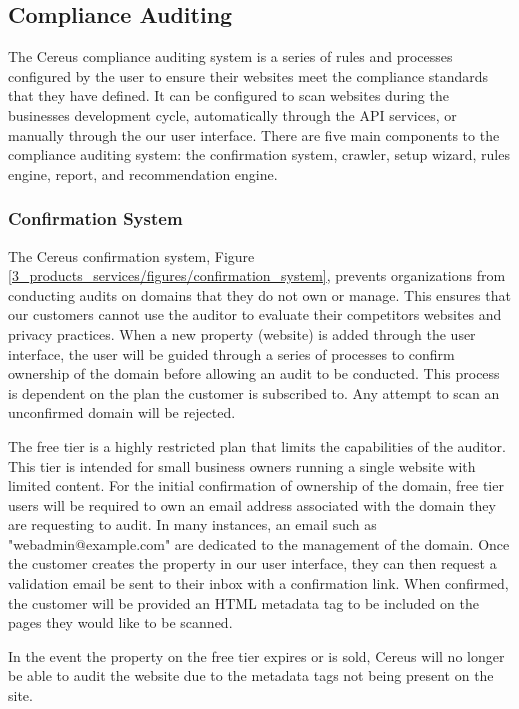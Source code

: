 \subsection{Compliance Auditing}

The Cereus compliance auditing system is a series of rules and processes configured by the user to ensure their websites meet the compliance standards that they have defined. It can be configured to scan websites during the businesses development cycle, automatically through the API services, or manually through the our user interface. There are five main components to the compliance auditing system: the confirmation system, crawler, setup wizard, rules engine, report, and recommendation engine.

\subsubsection{Confirmation System}

The Cereus confirmation system, Figure \ref{3_products_services/figures/confirmation_system}, prevents organizations from conducting audits on domains that they do not own or manage. This ensures that our customers cannot use the auditor to evaluate their competitors websites and privacy practices. When a new property (website) is added through the user interface, the user will be guided through a series of processes to confirm ownership of the domain before allowing an audit to be conducted. This process is dependent on the plan the customer is subscribed to. Any attempt to scan an unconfirmed domain will be rejected.

The free tier is a highly restricted plan that limits the capabilities of the auditor. This tier is intended for small business owners running a single website with limited content. For the initial confirmation of ownership of the domain, free tier users will be required to own an email address associated with the domain they are requesting to audit. In many instances, an email such as "webadmin@example.com" are dedicated to the management of the domain. Once the customer creates the property in our user interface, they can then request a validation email be sent to their inbox with a confirmation link. When confirmed, the customer will be provided an HTML metadata tag to be included on the pages they would like to be scanned.

In the event the property on the free tier expires or is sold, Cereus will no longer be able to audit the website due to the metadata tags not being present on the site. 

